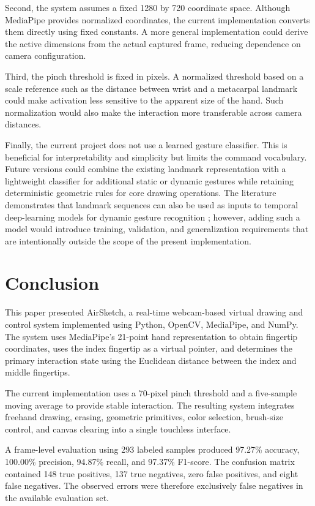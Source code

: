 \documentclass[conference]{IEEEtran}
\begin{document}
Second, the system assumes a fixed 1280 by 720 coordinate space. Although MediaPipe provides normalized coordinates, the current implementation converts them directly using fixed constants. A more general implementation could derive the active dimensions from the actual captured frame, reducing dependence on camera configuration.

Third, the pinch threshold is fixed in pixels. A normalized threshold based on a scale reference such as the distance between wrist and a metacarpal landmark could make activation less sensitive to the apparent size of the hand. Such normalization would also make the interaction more transferable across camera distances.

Finally, the current project does not use a learned gesture classifier. This is beneficial for interpretability and simplicity but limits the command vocabulary. Future versions could combine the existing landmark representation with a lightweight classifier for additional static or dynamic gestures while retaining deterministic geometric rules for core drawing operations. The literature demonstrates that landmark sequences can also be used as inputs to temporal deep-learning models for dynamic gesture recognition \cite{moreira2026,anithadevi2025}; however, adding such a model would introduce training, validation, and generalization requirements that are intentionally outside the scope of the present implementation.


\section{Conclusion}

This paper presented AirSketch, a real-time webcam-based virtual drawing and control system implemented using Python, OpenCV, MediaPipe, and NumPy. The system uses MediaPipe's 21-point hand representation to obtain fingertip coordinates, uses the index fingertip as a virtual pointer, and determines the primary interaction state using the Euclidean distance between the index and middle fingertips.

The current implementation uses a 70-pixel pinch threshold and a five-sample moving average to provide stable interaction. The resulting system integrates freehand drawing, erasing, geometric primitives, color selection, brush-size control, and canvas clearing into a single touchless interface.

A frame-level evaluation using 293 labeled samples produced 97.27\% accuracy, 100.00\% precision, 94.87\% recall, and 97.37\% F1-score. The confusion matrix contained 148 true positives, 137 true negatives, zero false positives, and eight false negatives. The observed errors were therefore exclusively false negatives in the available evaluation set.
\end{document}

